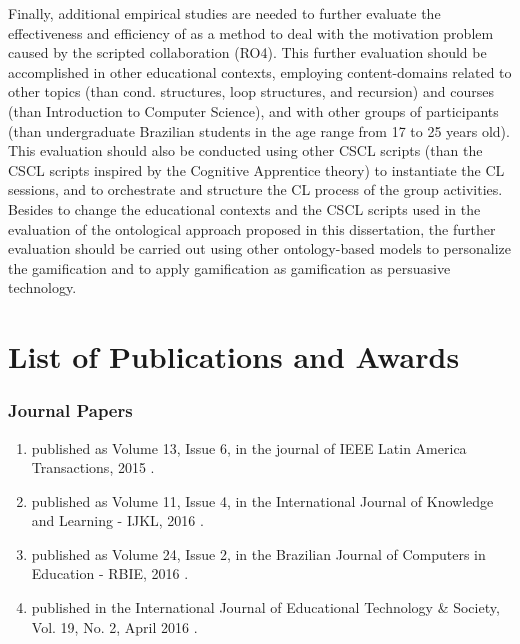 Finally, additional empirical studies are needed to further evaluate the effectiveness and efficiency of  as a method to deal with the motivation problem caused by the scripted collaboration (RO4).
This further evaluation should be accomplished in other educational contexts, employing content-domains related to other topics (than cond. structures, loop structures, and recursion) and courses (than Introduction to Computer Science), and with other groups of participants (than undergraduate Brazilian students in the age range from 17 to 25 years old). This evaluation should also be conducted using other CSCL scripts (than the CSCL scripts inspired by the Cognitive Apprentice theory) to instantiate the CL sessions, and to orchestrate and structure the CL process of the group activities. Besides to change the educational contexts and the CSCL scripts used in the evaluation of the ontological approach proposed in this dissertation, the further evaluation should be carried out using other ontology-based models to personalize the gamification and to apply gamification as gamification as persuasive technology.

\section{List of Publications and Awards}

\subsubsection*{Journal Papers}

\begin{enumerate}
\item
{} published as Volume 13, Issue 6, in the journal of IEEE Latin America Transactions, 2015 \cite{ChallcoMoreiraBittencourtMizoguchiIsotani2015}.

\item
{} published as Volume 11, Issue 4, in the International Journal of Knowledge and Learning - IJKL, 2016
\cite{ChallcoBittencourtIsotani2016}.


\item
{} published as Volume 24, Issue 2, in the Brazilian Journal of Computers in Education - RBIE, 2016 \cite{ChallcoMizoguchiIsotani2016}.

\item
{} published in the International Journal of Educational Technology \& Society, Vol. 19, No. 2, April 2016 \cite{ChallcoAndradeBorgesBittencourtIsotani2016}.
\end{enumerate}

